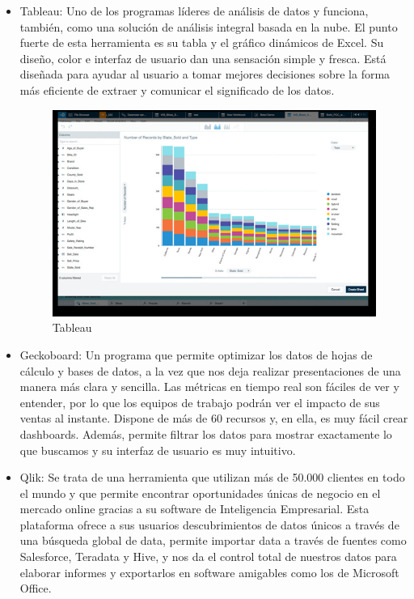 \documentclass[twoside,twocolumn]{article}
\begin{document}
\begin{itemize}
\item	Tableau:
Uno de los programas líderes de análisis de datos y funciona, también, como una solución de análisis integral basada en la nube. El punto fuerte de esta herramienta es su tabla y el gráfico dinámicos de Excel. Su diseño, color e interfaz de usuario dan una sensación simple y fresca. Está diseñada para ayudar al usuario a tomar mejores decisiones sobre la forma más eficiente de extraer y comunicar el significado de los datos.

\begin{figure}[h!]
	\centering
	\includegraphics[scale=0.45]{Image/c8.PNG}
	\caption{Tableau}
	\label{fig:Csha3}
\end{figure}


\item	Geckoboard: 
Un programa que permite optimizar los datos de hojas de cálculo y bases de datos, a la vez que nos deja realizar presentaciones de una manera más clara y sencilla. Las métricas en tiempo real son fáciles de ver y entender, por lo que los equipos de trabajo podrán ver el impacto de sus ventas al instante. Dispone de más de 60 recursos y, en ella, es muy fácil crear dashboards. Además, permite filtrar los datos para mostrar exactamente lo que buscamos y su interfaz de usuario es muy intuitivo.
\newline
\item Qlik:
Se trata de una herramienta que utilizan más de 50.000 clientes en todo el mundo y que permite encontrar oportunidades únicas de negocio en el mercado online gracias a su software de Inteligencia Empresarial. Esta plataforma ofrece a sus usuarios descubrimientos de datos únicos a través de una búsqueda global de data, permite importar data a través de fuentes como Salesforce, Teradata y Hive, y nos da el control total de nuestros datos para elaborar informes y exportarlos en software amigables como los de Microsoft Office.


\end{itemize}
\end{document}
